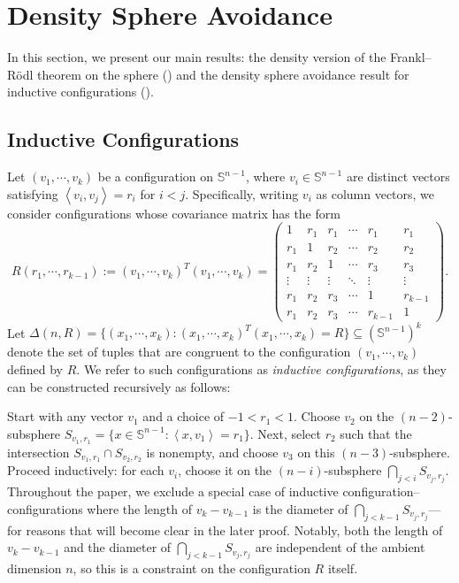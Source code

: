 \documentclass[11pt]{article}
\newcommand{\inner}[1]{\left\langle{#1}\right\rangle}
\newcommand{\sn}{{\mathbb{S}^{n-1} }}
\begin{document}
\section{Density Sphere Avoidance}\label{sec: sphere configurations}
In this section, we present our main results: the density version of the Frankl–R\"{o}dl theorem on the sphere () and the density sphere avoidance result for inductive configurations ().

\subsection{Inductive Configurations}
Let \( (v_1,\cdots,v_k) \) be a configuration on \( \sn \), where \( v_i \in \sn \) are distinct vectors satisfying \( \inner{v_i, v_j} = r_i \) for \( i < j \). Specifically, writing $v_i$ as column vectors, we consider configurations whose covariance matrix has the form
\[
R(r_1,\cdots,r_{k-1}) := (v_1,\cdots,v_k)^T(v_1,\cdots,v_k) =
\begin{pmatrix}
1 & r_1 & r_1 & \cdots & r_1 & r_1 \\
r_1 & 1 & r_2 & \cdots & r_2 & r_2 \\
r_1 & r_2 & 1 & \cdots & r_3 & r_3 \\
\vdots & \vdots & \vdots & \ddots & \vdots & \vdots \\
r_1 & r_2 & r_3 & \cdots & 1 & r_{k-1} \\
r_1 & r_2 & r_3 & \cdots & r_{k-1} & 1
\end{pmatrix}.
\]
Let \( \Delta(n, R) = \{(x_1, \cdots, x_k) : (x_1, \cdots, x_k)^T(x_1, \cdots, x_k) = R\} \subseteq (\sn)^k \) denote the set of tuples that are congruent to the configuration \( (v_1, \cdots, v_k) \) defined by \( R \). We refer to such configurations as \emph{inductive configurations}, as they can be constructed recursively as follows:

Start with any vector \( v_1 \) and a choice of \( -1 < r_1 < 1 \). Choose \( v_2 \) on the \((n-2)\)-subsphere \( S_{v_1, r_1} = \{x \in \sn : \inner{x, v_1} = r_1\} \). Next, select \( r_2 \) such that the intersection \( S_{v_1, r_1} \cap S_{v_2, r_2} \) is nonempty, and choose \( v_3 \) on this \((n-3)\)-subsphere. Proceed inductively: for each \( v_i \), choose it on the \((n-i)\)-subsphere \( \bigcap_{j < i} S_{v_j, r_j} \).
\\

Throughout the paper, we exclude a special case of inductive configuration--configurations where the length of $v_{k}-v_{k-1}$ is the diameter of $\bigcap_{j<k-1}S_{v_j,r_j}$---for reasons that will become clear in the later proof. Notably, both the length of \( v_k - v_{k-1} \) and the diameter of \( \bigcap_{j < k-1} S_{v_j, r_j} \) are independent of the ambient dimension \( n \), so this is a constraint on the configuration \( R \) itself.
\\
\end{document}
